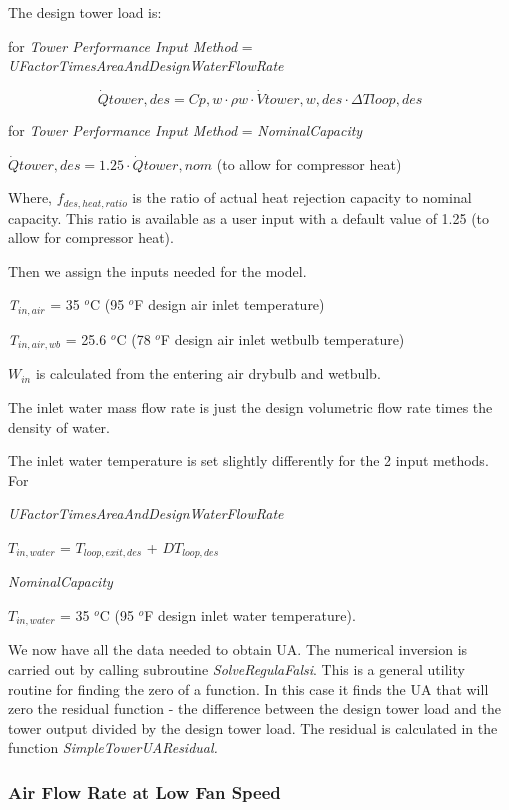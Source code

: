 The design tower load is:

for \emph{Tower Performance Input Method} = \emph{UFactorTimesAreaAndDesignWaterFlowRate}

\begin{equation}
\dot Qtower,des = Cp,w\cdot \rho w\cdot \dot Vtower,w,des\cdot \Delta Tloop,des
\end{equation}

for \emph{Tower Performance Input Method} = \emph{NominalCapacity}

\(\dot Qtower,des = 1.25\cdot \dot Qtower,nom\) (to allow for compressor heat)

Where, \({f_{des,heat,ratio}}\) is the ratio of actual heat rejection capacity to nominal capacity. This ratio is available as a user input with a default value of 1.25 (to allow for compressor heat).

Then we assign the inputs needed for the model.

\emph{T\(_{in,air}\)} = 35 \(^{o}\)C (95 \(^{o}\)F design air inlet temperature)

\emph{T\(_{in,air,wb}\)} = 25.6 \(^{o}\)C (78 \(^{o}\)F design air inlet wetbulb temperature)

\(W_{in}\) is calculated from the entering air drybulb and wetbulb.

The inlet water mass flow rate is just the design volumetric flow rate times the density of water.

The inlet water temperature is set slightly differently for the 2 input methods. For

\emph{UFactorTimesAreaAndDesignWaterFlowRate}

\(T_{in,water}\) = \(T_{loop,exit,des}\) + \(DT_{loop,des}\)

\emph{NominalCapacity}

\(T_{in,water}\) = 35 \(^{o}\)C (95 \(^{o}\)F design inlet water temperature).

We now have all the data needed to obtain UA. The numerical inversion is carried out by calling subroutine \emph{SolveRegulaFalsi}. This is a general utility routine for finding the zero of a function. In this case it finds the UA that will zero the residual function - the difference between the design tower load and the tower output divided by the design tower load. The residual is calculated in the function \emph{SimpleTowerUAResidual.}

\subsubsection{Air Flow Rate at Low Fan Speed}\label{air-flow-rate-at-low-fan-speed}

